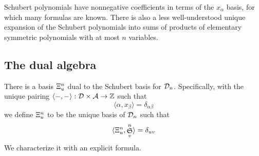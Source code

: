 \documentclass{elsarticle}
\newtheorem{lemma}{Lemma}[section]
\theoremstyle{definition}
\theoremstyle{remark}
\numberwithin{equation}{subsection}
\DeclareMathOperator{\sch}{\mathfrak{S}}
\newcommand{\code}{\mathfrak{c}}
\begin{document}
Schubert polynomials have nonnegative coefficients in terms of the $x_\alpha$ basis, for which many formulas are known. There is also a less well-understood unique expansion of the Schubert polynomials into sums of products of elementary symmetric polynomials with at most $n$ variables. %


\newcommand{\sdom}{\widetilde{\mu}}



\subsection{The dual algebra}

There is a basis $\Xi_u^{n}$ dual to the Schubert basis for $\mathcal{D}_n$. Specifically, with the unique pairing $\langle -,-\rangle:\mathcal{D}\times \mathcal{A}\to\mathbb{Z}$ such that
$$\langle \alpha,x_\beta\rangle = \delta_{\alpha\beta}$$
we define $\Xi_u^n$ to be the unique basis of $\mathcal{D}_n$ such that
$$\langle \dsch_u^n,\sch_v^n\rangle = \delta_{uv}$$
We characterize it with an explicit formula.
\end{document}
